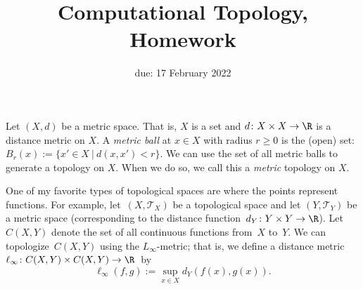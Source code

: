 \documentclass{article}
\title{Computational Topology, Homework \hwnum}
\author{\todo{your name here}}
\date{due: 17 February 2022}
\begin{document}
\maketitle



Let $(X,d)$ be a metric space.  That is, $X$ is a set and $d \colon X \times X
\to \R$ is a distance metric on $X$.  A \emph{metric ball} at $x \in X$ with
radius $r \geq 0$ is the (open) set: $B_r(x) := \{x' \in X ~|~ d(x,x') < r \}$.
We can use the set of all metric balls to generate a
topology on $X$.  When we do so, we call this a \emph{metric} topology on $X$.

One of my favorite types of topological spaces are where the points represent
functions.  For example, let~$(X,\mathcal{T}_X)$ be a topological space
and let $(Y,\mathcal{T}_Y)$ be
a metric space (corresponding to the distance function~$d_Y
\colon Y \times Y \to \R$).  Let $C(X,Y)$ denote the set of all continuous
functions from~$X$ to~$Y$.  We can topologize~$C(X,Y)$ using the $L_{\infty}$-metric; that is,
we define a distance metric $\ell_{\infty} \colon C(X,Y) \times C(X,Y) \to
\R$~by
$$\ell_{\infty}(f,g) := \sup_{x \in X} d_Y(f(x),g(x)).$$
\end{document}
